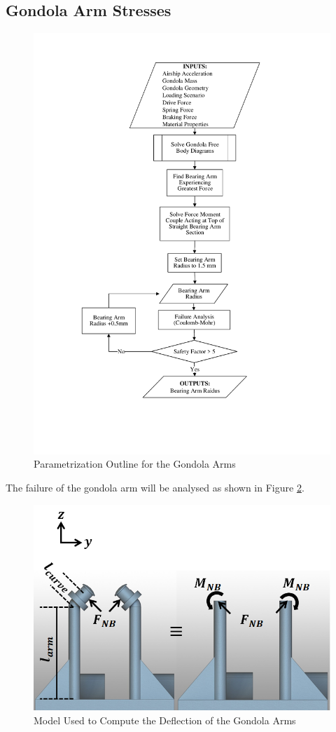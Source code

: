 \documentclass[../main.tex]{subfiles}
\begin{document}
\subsection{Gondola Arm Stresses} \label{bearingArm}

\begin{figure}[H]
	\centering
	\includegraphics[width=.7\linewidth]{img/paramaterization/gondolaArms.pdf}
	\caption{Parametrization Outline for the Gondola Arms}
	\label{fig:gondolaArmParametrization}
\end{figure}

The failure of the gondola arm will be analysed as shown in Figure \ref{fig:deflection}. 

\begin{figure}[H]
	\centering
	\includegraphics[width=.8\linewidth]{img/gondola/armDeflection.PNG}
	\caption{Model Used to Compute the Deflection of the Gondola Arms}
	\label{fig:deflection}
\end{figure}
\end{document}
